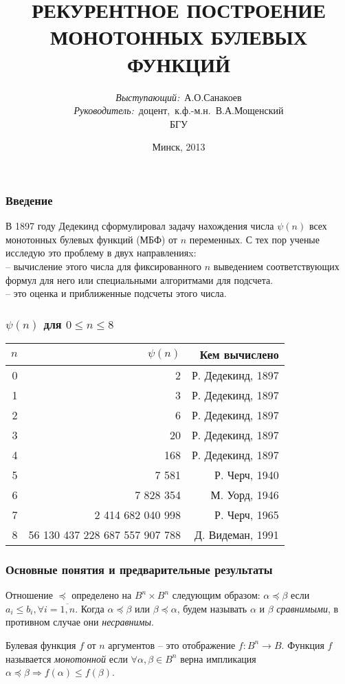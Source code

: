 \documentclass[14pt]{beamer}
\title{\small{РЕКУРЕНТНОЕ ПОСТРОЕНИЕ МОНОТОННЫХ БУЛЕВЫХ ФУНКЦИЙ}}
\author{\small{%
\emph{Выступающий:}~А.О.Санакоев\\%
\emph{Руководитель:}~доцент,~к.ф.-м.н.~В.А.Мощенский}\\%
\vspace{30pt}%
БГУ
\vspace{20pt}%
}
\date{\small{Минск, 2013}}
\theoremstyle{plain} %
\theoremstyle{remark}
\newcommand{\al}{\alpha}
\newcommand{\be}{\beta}
\newcommand\T{\rule{0pt}{2.6ex}}       %
\newcommand\B{\rule[-1.2ex]{0pt}{0pt}} %
\begin{document}
\maketitle


\begin{frame}
\frametitle{Введение}
В 1897 году Дедекинд сформулировал задачу нахождения числа $\psi(n)$ всех монотонных булевых функций (МБФ) 
 от $n$ переменных.
 С тех пор ученые исследую это проблему в двух
 направленияx:\\
 -- вычисление этого числа для фиксированного $n$
 выведением соответствующих формул для него или специальными
 алгоритмами для подсчета.\\ 
 -- это оценка и приближенные подсчеты этого числа.
\end{frame}

\begin{frame}
\frametitle{$\psi(n)$ для $0 \leq n \leq 8$}
\begin{center}
 \begin{tabular}{ r | r | r } 
  $n$ & $\psi(n)$ & Кем вычислено \\
  \hline
  0 & 	2				& \T Р. Дедекинд, 1897 \\
  1 & 	3 				& Р. Дедекинд, 1897 \\
  2 & 	6 				& Р. Дедекинд, 1897 \\
  3 & 	20 				& Р. Дедекинд, 1897 \\
  4 & 	168 				& Р. Дедекинд, 1897 \\
  5 & 	7 581 				& Р. Черч, 1940 \\
  6 &	7 828 354			& М. Уорд, 1946 \\
  7 &	2 414 682 040 998 		& Р. Черч, 1965 \\
  8 &	56 130 437 228 687 557 907 788 	& \B Д. Видеман, 1991 \\
  \hline
  \end{tabular}
\end{center}
\end{frame}

\begin{frame}
\frametitle{Основные понятия и предварительные результаты}
Отношение $\preceq$ определено на $B^n \times B^n$ следующим образом:
$\alpha \preceq \beta$  если 
$a_i \leq b_i, \forall i = \overline{1,n}$. 
Когда $\alpha \preceq \beta$ или $\beta \preceq \alpha$, будем называть
$\al$ и $\be$ \emph{сравнимыми}, в противном случае они \emph{несравнимы}.\par
  Булевая функция $f$ от $n$ аргументов -- это отображение 
$f : B^n \rightarrow B$. Функция $f$ называется \emph{монотонной} 
если $\forall \al, \be \in B^n$ верна импликация 
$\al \preceq \be \Rightarrow f(\al) \leq f(\be)$.
\end{frame}
\end{document}
